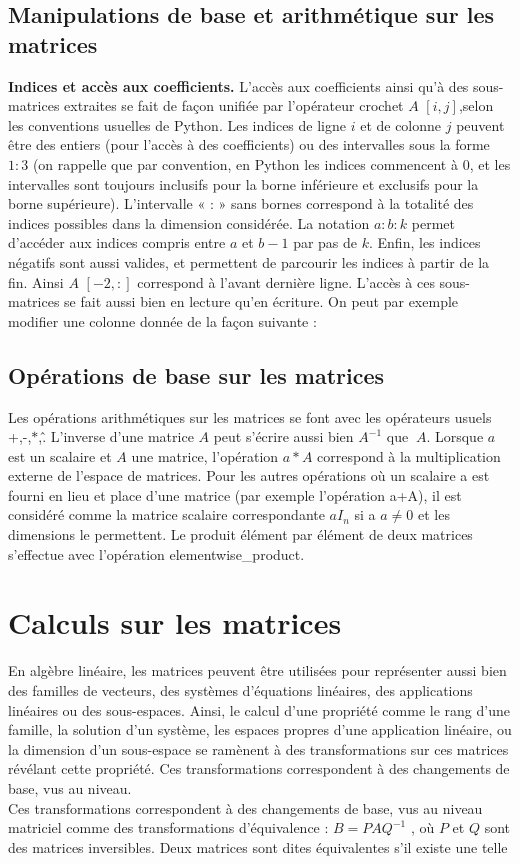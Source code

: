 \subsection{ Manipulations de base et arithmétique sur les matrices}
\textbf{Indices et accès aux coefficients.} L'accès aux coefficients ainsi qu’à des
sous-matrices extraites se fait de façon unifiée par l’opérateur crochet $A$ $\left[i, j\right]$,selon les 
conventions usuelles de Python. Les indices de ligne $i$ et de colonne $j$ peuvent être des entiers (pour 
l’accès à des coefficients) ou des intervalles sous la forme $1:3$ (on rappelle que par convention, en Python 
les indices commencent à $0$, et les intervalles sont toujours inclusifs pour la borne inférieure et exclusifs 
pour la borne supérieure). L’intervalle « : » sans bornes correspond à la totalité des indices possibles dans la 
dimension considérée. La notation $a:b:k$ permet d’accéder aux indices compris entre $a$ et $b-1$ par pas de 
$k$. Enfin, les indices négatifs sont aussi valides, et permettent de parcourir les indices à partir de la
fin. Ainsi $A$ $\left[-2,:\right]$ correspond à l’avant dernière ligne. L'accès à ces sous-matrices
se fait aussi bien en lecture qu’en écriture. On peut par exemple modifier une colonne donnée de la façon 
suivante :
\subsection{ Opérations de base sur les matrices}
Les opérations arithmétiques sur les matrices se font avec les opérateurs usuels +,-,$\ast$,\^. L’inverse 
d’une matrice $A$ peut s’écrire aussi bien $A^{-1}$ que $~A$. Lorsque $a$ est un scalaire et $A$ une matrice, 
l’opération $a*A$ correspond à la multiplication externe de l’espace de matrices. Pour les autres opérations où 
un scalaire a est fourni en lieu et place d’une matrice (par exemple l’opération a+A), il est considéré comme la 
matrice scalaire correspondante $aI_{n}$ si a $a\neq 0$ et les dimensions le permettent. Le produit élément par 
élément de deux matrices s’effectue avec l’opération elementwise\_product.
\section{ Calculs sur les matrices}
En algèbre linéaire, les matrices peuvent être utilisées pour représenter aussi bien des familles de vecteurs, 
des systèmes d’équations linéaires, des applications linéaires ou des sous-espaces. Ainsi, le calcul d’une 
propriété comme le rang d’une famille, la solution d’un système, les espaces propres d’une application linéaire, 
ou la dimension d’un sous-espace se ramènent à des transformations sur ces matrices révélant cette propriété. 
Ces transformations correspondent à des changements de base, vus au niveau.
\\
Ces transformations correspondent à des changements de base, vus au niveau
matriciel comme des transformations d’équivalence : $B = PAQ^{-1}$ , où $P$ et $Q$ sont
des matrices inversibles. Deux matrices sont dites équivalentes s’il existe une telle


